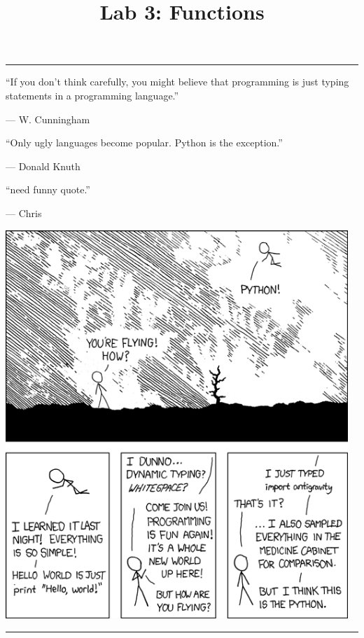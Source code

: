 \documentclass[11pt]{cselabheader}
\title{Lab 3: Functions}
\begin{document}

\maketitle

\hrule
\vspace{0.5em}
\begin{minipage}{0.32\textwidth}

``If you don't think carefully, you might believe that programming is just
typing statements in a programming language.''
\begin{flushright}
  --- W. Cunningham
\end{flushright}

\vspace{2em}

``Only ugly languages become popular. Python is the exception.''
\begin{flushright}
  --- Donald Knuth
\end{flushright}

\vspace{2em}

``need funny quote.''
\begin{flushright}
  --- Chris
\end{flushright}

\end{minipage} 
\begin{minipage}{0.68\textwidth}
  \begin{flushright}
  \includegraphics[width=0.97\textwidth]{img/xkcd_python.png}
  \end{flushright}
\end{minipage}
\vspace{0.5em}
\hrule
\end{document}
